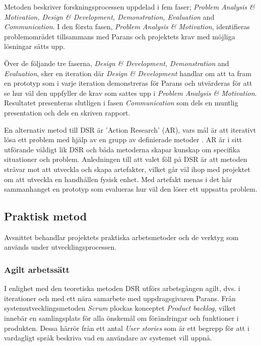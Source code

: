 \documentclass{article}
\begin{document}
            \noindent Metoden beskriver forskningsprocessen uppdelad i fem faser; 
            \textit{Problem Analysis \& Motivation, Design \& Development, Demonstration, Evaluation} and \textit{Communication}. 
            I den första fasen, \textit{Problem Analysis \& Motivation}, identifieras problemområdet tillsammans med Parans och projektets krav med möjliga lösningar sätts upp. \bigskip

            \noindent Över de följande tre faserna, \textit{Design \& Development, Demonstration} and \textit{Evaluation}, sker en iteration där \textit{Design \& Development} handlar om att ta fram en prototyp som i varje iteration demonstreras för Parans och utvärderas för att se hur väl den uppfyller de krav som sattes upp i \textit{Problem Analysis \& Motivation}. \bigskip
            Resultatet presenteras slutligen i fasen \textit{Communication} som dels en muntlig presentation och dels en skriven rapport. \bigskip

            \noindent En alternativ metod till DSR är 'Action Research' (AR), vars mål är att iterativt lösa ett problem med hjälp av en grupp av definierade metoder \cite{actionresearch}. AR är i sitt utförande väldigt lik DSR \cite{designscience} och båda metoderna skapar kunskap om specifika situationer och problem. Anledningen till att valet föll på DSR är att metoden strävar mot att utveckla och skapa artefakter, vilket går väl ihop med projektet om att utveckla en handhållen fysisk enhet. 
            Med artefakt menas i det här sammanhanget en prototyp som evalueras hur väl den löser ett uppsatta problem. 

        \newpage

        \subsection{Praktisk metod} %
        \label{sub:praktiskmetod}
            Avsnittet behandlar projektets praktiska arbetsmetoder och de verktyg som används under utvecklingsprocessen.

            \subsubsection{Agilt arbetssätt} %
            \label{subsub:agilt}
            I enlighet med den teoretiska metoden DSR utförs arbetsgången agilt, dvs. i iterationer och med ett nära samarbete med uppdragsgivaren Parans.
            Från systemutvecklingsmetoden \hbox{\textit{Scrum}} plockas konceptet \textit{Product backlog}, vilket innebär en samlingsplats för alla önskemål om förändringar och funktioner i produkten.
            Dessa härrör från ett antal \textit{User stories} som är ett begrepp för att i vardagligt språk beskriva vad en användare av systemet vill uppnå.\\
\end{document}
